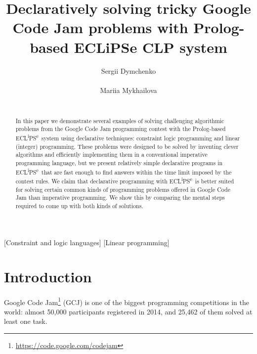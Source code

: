 \documentclass{acm_proc_article-sp}
\begin{document}
\newcommand{\eclipse}{ECL\textsuperscript{i}PS\textsuperscript{e}}

\makeatletter
\newcommand*{\bdiv}{\nonscript\mskip-\medmuskip\mkern5mu\mathbin{\operator@font div}\penalty900\mkern5mu\nonscript\mskip-\medmuskip
}
\makeatother

\title{Declaratively solving tricky Google Code Jam problems with Prolog-based ECLiPSe CLP system}

\author{
\alignauthor
Sergii Dymchenko\\
       \\
\alignauthor
Mariia Mykhailova\\
       \\
}
\maketitle

\begin{abstract}
In this paper we demonstrate several examples of solving challenging algorithmic problems from the Google Code Jam programming contest
with the Prolog-based \eclipse\ system using declarative techniques: constraint logic programming and linear (integer) programming.
These problems were designed to be solved by inventing clever algorithms and efficiently implementing them in a conventional imperative programming language,
but we present relatively simple declarative programs in \eclipse\ that are fast enough to find answers within the time limit imposed by the contest rules.
We claim that declarative programming with \eclipse\ is better suited for solving certain common kinds of programming problems offered in Google Code Jam than imperative programming.
We show this by comparing the mental steps required to come up with both kinds of solutions.

\end{abstract}

[Constraint and logic languages]
[Linear programming]


\section{Introduction}
Google Code Jam\footnote{\url{https://code.google.com/codejam}} (GCJ) is one of the
biggest programming competitions in the world: almost 50,000 participants registered in 2014, and 25,462 of them solved at least one task.
\end{document}
